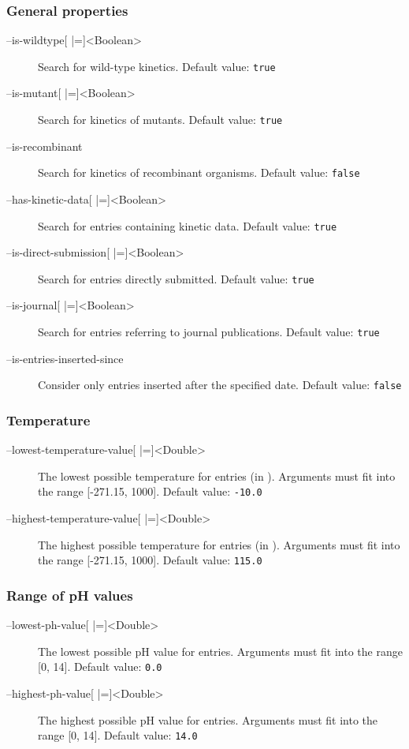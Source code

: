 \subsubsection{General properties}
\begin{description}
\item[--is-wildtype{[} |={]}<Boolean>]
  Search for wild-type kinetics.
  Default value: \texttt{true}

\item[--is-mutant{[} |={]}<Boolean>]
  Search for kinetics of mutants.
  Default value: \texttt{true}

\item[--is-recombinant]
  Search for kinetics of recombinant organisms.
  Default value: \texttt{false}

\item[--has-kinetic-data{[} |={]}<Boolean>]
  Search for entries containing kinetic data.
  Default value: \texttt{true}

\item[--is-direct-submission{[} |={]}<Boolean>]
  Search for entries directly submitted.
  Default value: \texttt{true}

\item[--is-journal{[} |={]}<Boolean>]
  Search for entries referring to journal publications.
  Default value: \texttt{true}

\item[--is-entries-inserted-since]
  Consider only entries inserted after the specified date.
  Default value: \texttt{false}
\end{description}

\subsubsection{Temperature}
\begin{description}
\item[--lowest-temperature-value{[} |={]}<Double>]
  The lowest possible temperature for entries (in \textcelsius).
  Arguments must fit into the range {[}-271.15, 1000{]}.
  Default value: \texttt{-10.0}

\item[--highest-temperature-value{[} |={]}<Double>]
  The highest possible temperature for entries (in \textcelsius).
  Arguments must fit into the range {[}-271.15, 1000{]}.
  Default value: \texttt{115.0}
\end{description}

\subsubsection{Range of pH values}
\begin{description}
\item[--lowest-ph-value{[} |={]}<Double>]
  The lowest possible pH value for entries.
  Arguments must fit into the range {[}0, 14{]}.
  Default value: \texttt{0.0}

\item[--highest-ph-value{[} |={]}<Double>]
  The highest possible pH value for entries.
  Arguments must fit into the range {[}0, 14{]}.
  Default value: \texttt{14.0}
\end{description}

